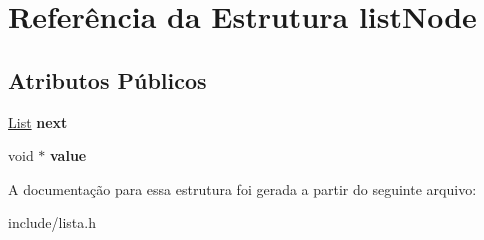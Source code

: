 \hypertarget{structlistNode}{}\section{Referência da Estrutura list\+Node}
\label{structlistNode}
\subsection*{Atributos Públicos}
\begin{DoxyCompactItemize}
\item 
\mbox{\label{structlistNode_ac8957f39101f8155faeb994dd6ae4915}} 
\hyperlink{structlistNode}{List} {\bfseries next}
\item 
\mbox{\label{structlistNode_a772dfdd1352f9a568bb567d65cb7b92a}} 
void $\ast$ {\bfseries value}
\end{DoxyCompactItemize}


A documentação para essa estrutura foi gerada a partir do seguinte arquivo\+:\begin{DoxyCompactItemize}
\item 
include/lista.\+h\end{DoxyCompactItemize}
